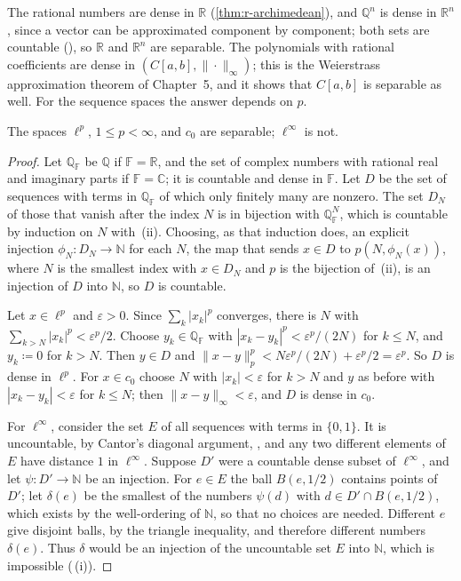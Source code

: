 The rational numbers are dense in $\mathbb R$ (\cref{thm:r-archimedean}), and $\mathbb Q^n$ is dense in $\mathbb R^n$, since a vector can be approximated component by component; both sets are countable (), so $\mathbb R$ and $\mathbb R^n$ are separable. The polynomials with rational coefficients are dense in $(C[a,b],\|\cdot\|_\infty)$; this is the Weierstrass approximation theorem of Chapter~5, and it shows that $C[a,b]$ is separable as well. For the sequence spaces the answer depends on $p$.

\begin{proposition}
\label{prop:separable}
The spaces $\ell^p$, $1\le p<\infty$, and $c_0$ are separable; $\ell^\infty$ is not.
\end{proposition}

\begin{proof}
Let $\mathbb Q_{\mathbb F}$ be $\mathbb Q$ if $\mathbb F=\mathbb R$, and the set of complex numbers with rational real and imaginary parts if $\mathbb F=\mathbb C$; it is countable and dense in $\mathbb F$. Let $D$ be the set of sequences with terms in $\mathbb Q_{\mathbb F}$ of which only finitely many are nonzero. The set $D_N$ of those that vanish after the index $N$ is in bijection with $\mathbb Q_{\mathbb F}^N$, which is countable by induction on $N$ with \,(ii). Choosing, as that induction does, an explicit injection $\phi_N\colon D_N\to\mathbb N$ for each $N$, the map that sends $x\in D$ to $p(N,\phi_N(x))$, where $N$ is the smallest index with $x\in D_N$ and $p$ is the bijection of \,(ii), is an injection of $D$ into $\mathbb N$, so $D$ is countable.

Let $x\in\ell^p$ and $\varepsilon>0$. Since $\sum_k|x_k|^p$ converges, there is $N$ with $\sum_{k>N}|x_k|^p<\varepsilon^p/2$. Choose $y_k\in\mathbb Q_{\mathbb F}$ with $|x_k-y_k|^p<\varepsilon^p/(2N)$ for $k\le N$, and $y_k\coloneqq0$ for $k>N$. Then $y\in D$ and $\|x-y\|_p^p<N\varepsilon^p/(2N)+\varepsilon^p/2=\varepsilon^p$. So $D$ is dense in $\ell^p$. For $x\in c_0$ choose $N$ with $|x_k|<\varepsilon$ for $k>N$ and $y$ as before with $|x_k-y_k|<\varepsilon$ for $k\le N$; then $\|x-y\|_\infty<\varepsilon$, and $D$ is dense in $c_0$.

For $\ell^\infty$, consider the set $E$ of all sequences with terms in $\{0,1\}$. It is uncountable, by Cantor's diagonal argument, , and any two different elements of $E$ have distance $1$ in $\ell^\infty$. Suppose $D'$ were a countable dense subset of $\ell^\infty$, and let $\psi\colon D'\to\mathbb N$ be an injection. For $e\in E$ the ball $B(e,1/2)$ contains points of $D'$; let $\delta(e)$ be the smallest of the numbers $\psi(d)$ with $d\in D'\cap B(e,1/2)$, which exists by the well-ordering of $\mathbb N$, so that no choices are needed. Different $e$ give disjoint balls, by the triangle inequality, and therefore different numbers $\delta(e)$. Thus $\delta$ would be an injection of the uncountable set $E$ into $\mathbb N$, which is impossible (\,(i)).
\end{proof}

